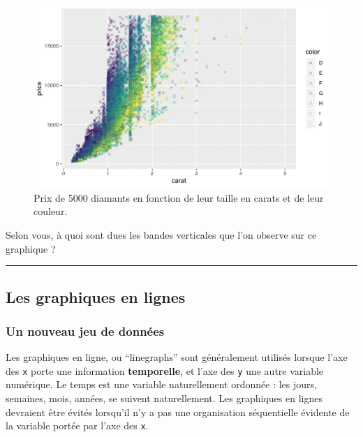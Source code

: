 \documentclass[a4paperpaper,]{article}
\theoremstyle{definition}
\theoremstyle{definition}
\theoremstyle{definition}
\theoremstyle{remark}
\begin{document}
\begin{figure}[htpb]

{\centering \includegraphics[width=0.9\linewidth]{figure/exodiamonds-1} 

}

\caption{Prix de 5000 diamants en fonction de leur taille en carats et de leur couleur.}\label{fig:exodiamonds}
\end{figure}

Selon vous, à quoi sont dues les bandes verticales que l'on observe sur
ce graphique ?

\begin{center}\rule{0.5\linewidth}{\linethickness}\end{center}

\hypertarget{les-graphiques-en-lignes}{%
\subsection{Les graphiques en lignes}\label{les-graphiques-en-lignes}}

\hypertarget{un-nouveau-jeu-de-donnees}{%
\subsubsection{Un nouveau jeu de
données}\label{un-nouveau-jeu-de-donnees}}

Les graphiques en ligne, ou ``linegraphs'' sont généralement utilisés
lorsque l'axe des \texttt{x} porte une information \textbf{temporelle},
et l'axe des \texttt{y} une autre variable numérique. Le temps est une
variable naturellement ordonnée : les jours, semaines, mois, années, se
suivent naturellement. Les graphiques en lignes devraient être évités
lorsqu'il n'y a pas une organisation séquentielle évidente de la
variable portée par l'axe des \texttt{x}.
\end{document}

